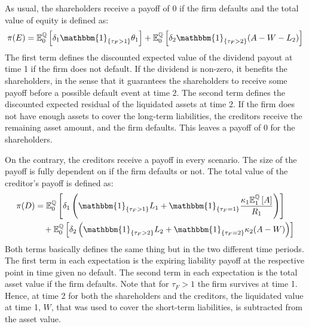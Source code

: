 \documentclass[main.tex]{subfiles}
\begin{document}
        As usual, the shareholders receive a payoff of 0 if the firm defaults and
        the total value of equity is defined as:
        \begin{equation*}
            \pi(E)=
            \mathbb{E}_{0}^{\rnmeasure}\left[
                \delta_1\mathbbm{1}_{\{\tau_{F}>1\}} \theta_1
            \right]
            +
            \mathbb{E}_{0}^{\rnmeasure}\left[
                \delta_{2}\mathbbm{1}_{\{\tau_{F}>2\}} (A-W-L_{2})
            \right]
        \end{equation*}
        The first term defines the discounted expected value of the dividend payout at time 1 if the firm does not default.
        If the dividend is non-zero, it benefits the shareholders,
        in the sense that it guarantees the shareholders to receive some payoff before a possible default event at time 2.
        The second term defines the discounted expected residual of the liquidated assets at time 2.
        If the firm does not have enough assets to cover the long-term liabilities, the creditors receive the remaining asset amount,
        and the firm defaults.
        This leaves a payoff of 0 for the shareholders.

        On the contrary, the creditors receive a payoff in every scenario.
        The size of the payoff is fully dependent on if the firm defaults or not.
        The total value of the creditor's payoff is defined as:
        \begin{align*}
            \pi(D)&=
            \mathbb{E}_{0}^{\rnmeasure}\left[
                \delta_1
                \left(\mathbbm{1}_{\{\tau_{F}>1\}} L_1 + \mathbbm{1}_{\{\tau_{F}=1\}} 
                \frac{
                    \kappa_1 \mathbb{E}_{1}^{\rnmeasure}\left[A\right]
                }{
                    R_1
                }
                \right)
            \right]
            \nonumber
            \\
            &\quad+
            \mathbb{E}_{0}^{\rnmeasure}\left[
                \delta_{2}
                \left(\mathbbm{1}_{\{\tau_{F}>2\}}L_{2}
                +
                \mathbbm{1}_{\{\tau_{F}=2\}}\kappa_{2}(A-W)
                \right)
            \right]
        \end{align*}
        Both terms basically defines the same thing but in the two different time periods.
        The first term in each expectation is the expiring liability payoff at the respective point in time given no default.
        The second term in each expectation is the total asset value if the firm defaults.
        Note that for $\tau_{F}>1$ the firm survives at time 1.
        Hence, at time 2 for both the shareholders and the creditors, the liquidated value at time 1, $W$,
        that was used to cover the short-term liabilities, is subtracted from the asset value.
\end{document}

